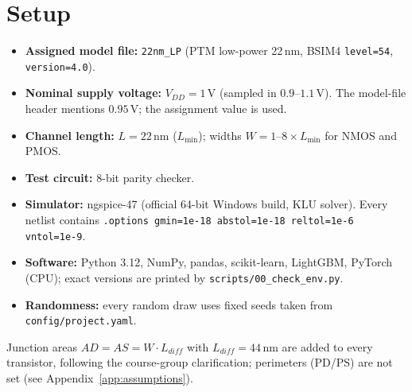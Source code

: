 \section{Setup}
\begin{itemize}[nosep]
  \item \textbf{Assigned model file:} \texttt{22nm\_LP} (PTM low-power 22\,nm, BSIM4 \texttt{level=54}, \texttt{version=4.0}).
  \item \textbf{Nominal supply voltage:} $V_{DD}=1\,\mathrm{V}$ (sampled in $0.9$--$1.1\,\mathrm{V}$). The model-file header mentions $0.95\,\mathrm{V}$; the assignment value is used.
  \item \textbf{Channel length:} $L=22\,\mathrm{nm}$ ($L_{\min}$); widths $W=1$--$8\times L_{\min}$ for NMOS and PMOS.
  \item \textbf{Test circuit:} 8-bit parity checker.
  \item \textbf{Simulator:} ngspice-47 (official 64-bit Windows build, KLU solver). Every netlist contains
        \texttt{.options gmin=1e-18 abstol=1e-18 reltol=1e-6 vntol=1e-9}.
  \item \textbf{Software:} Python 3.12, NumPy, pandas, scikit-learn, LightGBM, PyTorch (CPU); exact versions are printed by \texttt{scripts/00\_check\_env.py}.
  \item \textbf{Randomness:} every random draw uses fixed seeds taken from \texttt{config/project.yaml}.
\end{itemize}
Junction areas $AD=AS=W\cdot L_{diff}$ with $L_{diff}=44\,\mathrm{nm}$ are added to every transistor, following the course-group clarification;
perimeters (PD/PS) are not set (see Appendix~\ref{app:assumptions}).
